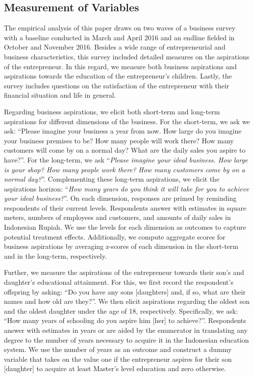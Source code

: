\documentclass[11.5pt]{article}
\begin{document}
{\subsection{Measurement of Variables}

The empirical analysis of this paper draws on two waves of a business survey with a baseline conducted in March and April 2016 and an endline fielded in October and November 2016. Besides a wide range of entrepreneurial and business characteristics, this survey included detailed measures on the aspirations of the entrepreneur. In this regard, we measure both business aspirations and aspirations towards the education of the entrepreneur's children. Lastly, the survey includes questions on the satisfaction of the entrepreneur with their financial situation and life in general.

Regarding business aspirations, we elicit both short-term and long-term aspirations for different dimensions of the business. For the short-term, we ask we ask: ``Please imagine your business a year from now. How large do you imagine your business premises to be? How many people will work there? How many customers will come by on a normal day? What are the daily sales you aspire to have?''. For the long-term, we ask ``\emph{Please imagine your ideal business. How large is your shop? How many people work there? How many customers come by on a normal day?}''. Complementing these long-term aspirations, we elicit the aspirations horizon: ``\emph{How many years do you think it will take for you to achieve your ideal business?}''. On each dimension, responses are primed by reminding respondents of their current levels. Respondents answer with estimates in square meters, numbers of employees and customers, and amounts of daily sales in Indonesian Rupiah. We use the levels for each dimension as outcomes to capture potential treatment effects. Additionally, we compute aggregate scores for business aspirations by averaging z-scores of each dimension in the short-term and in the long-term, respectively.

Further, we measure the aspirations of the entrepreneur towards their son's and daughter's educational attainment. For this, we first record the respondent's offspring by asking: ``Do you have any sons [daughters] and, if so, what are their names and how old are they?''. We then elicit aspirations regarding the oldest son and the oldest daughter under the age of 18, respectively. Specifically, we ask: ``How many years of schooling do you aspire him [her] to achieve?''. Respondents answer with estimates in years or are aided by the enumerator in translating any degree to the number of years necessary to acquire it in the Indonesian education system. We use the number of years as an outcome and construct a dummy variable that takes on the value one if the entrepreneur aspires for their son [daughter] to acquire at least Master's level education and zero otherwise.

}
\end{document}
